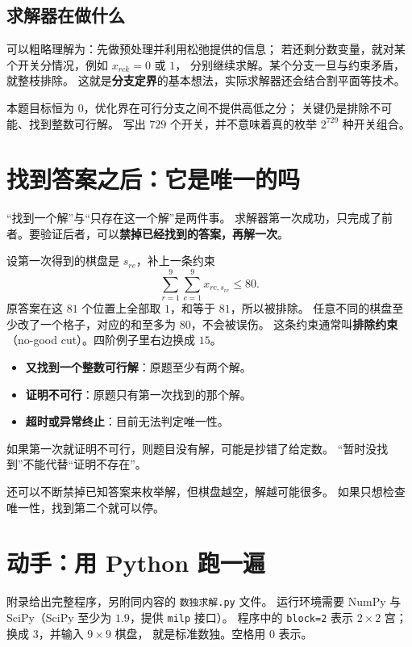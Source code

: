 \documentclass[UTF8,11pt,fontset=none]{ctexart}
\begin{document}
\subsection{求解器在做什么}
可以粗略理解为：先做预处理并利用松弛提供的信息；
若还剩分数变量，就对某个开关分情况，例如 $x_{rck}=0$ 或 $1$，
分别继续求解。某个分支一旦与约束矛盾，就整枝排除。
这就是\textbf{分支定界}的基本想法，实际求解器还会结合割平面等技术。

本题目标恒为 $0$，优化界在可行分支之间不提供高低之分；
关键仍是排除不可能、找到整数可行解。
写出 $729$ 个开关，并不意味着真的枚举 $2^{729}$ 种开关组合。

\section{找到答案之后：它是唯一的吗}
“找到一个解”与“只存在这一个解”是两件事。
求解器第一次成功，只完成了前者。要验证后者，可以\textbf{禁掉已经找到的答案，再解一次}。

设第一次得到的棋盘是 $s_{rc}$，补上一条约束
\begin{equation}\label{eq:exclude}
\boxed{\sum_{r=1}^9\sum_{c=1}^9 x_{rc,s_{rc}}\le80.}
\end{equation}
原答案在这 $81$ 个位置上全部取 $1$，和等于 $81$，所以被排除。
任意不同的棋盘至少改了一个格子，对应的和至多为 $80$，不会被误伤。
这条约束通常叫\textbf{排除约束}（no-good cut）。四阶例子里右边换成 $15$。

\begin{keybox}[第二次求解的三种结果]
\begin{itemize}
 \item \textbf{又找到一个整数可行解}：原题至少有两个解。
 \item \textbf{证明不可行}：原题只有第一次找到的那个解。
 \item \textbf{超时或异常终止}：目前无法判定唯一性。
\end{itemize}
如果第一次就证明不可行，则题目没有解，可能是抄错了给定数。
“暂时没找到”不能代替“证明不存在”。
\end{keybox}

还可以不断禁掉已知答案来枚举解，但棋盘越空，解越可能很多。
如果只想检查唯一性，找到第二个就可以停。

\section{动手：用 Python 跑一遍}
附录给出完整程序，另附同内容的 \texttt{数独求解.py} 文件。
运行环境需要 NumPy 与 SciPy（SciPy 至少为 $1.9$，提供 \texttt{milp} 接口）。
程序中的 \texttt{block=2} 表示 $2\times2$ 宫；换成 $3$，并输入 $9\times9$ 棋盘，
就是标准数独。空格用 $0$ 表示。
\end{document}
